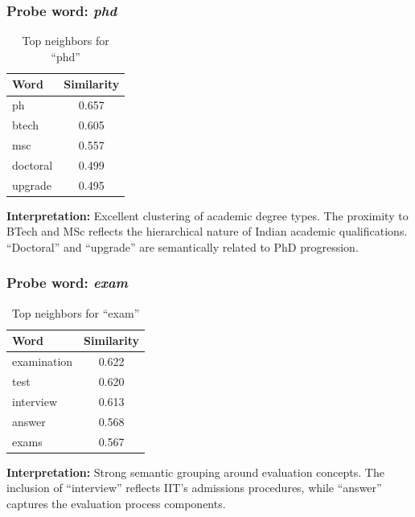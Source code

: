 \documentclass[11pt,a4paper]{report}
\begin{document}
\subsubsection{Probe word: \textit{phd}}
\begin{table}[H]
    \centering
    \begin{tabular}{lc}
        \toprule
        \textbf{Word} & \textbf{Similarity} \\
        \midrule
        ph & 0.657 \\
        btech & 0.605 \\
        msc & 0.557 \\
        doctoral & 0.499 \\
        upgrade & 0.495 \\
        \bottomrule
    \end{tabular}
    \caption{Top neighbors for ``phd''}
\end{table}

\textbf{Interpretation:} Excellent clustering of academic degree types. The proximity to BTech and MSc reflects the hierarchical nature of Indian academic qualifications. ``Doctoral'' and ``upgrade'' are semantically related to PhD progression.

\subsubsection{Probe word: \textit{exam}}
\begin{table}[H]
    \centering
    \begin{tabular}{lc}
        \toprule
        \textbf{Word} & \textbf{Similarity} \\
        \midrule
        examination & 0.622 \\
        test & 0.620 \\
        interview & 0.613 \\
        answer & 0.568 \\
        exams & 0.567 \\
        \bottomrule
    \end{tabular}
    \caption{Top neighbors for ``exam''}
\end{table}

\textbf{Interpretation:} Strong semantic grouping around evaluation concepts. The inclusion of ``interview'' reflects IIT's admissions procedures, while ``answer'' captures the evaluation process components.
\end{document}
